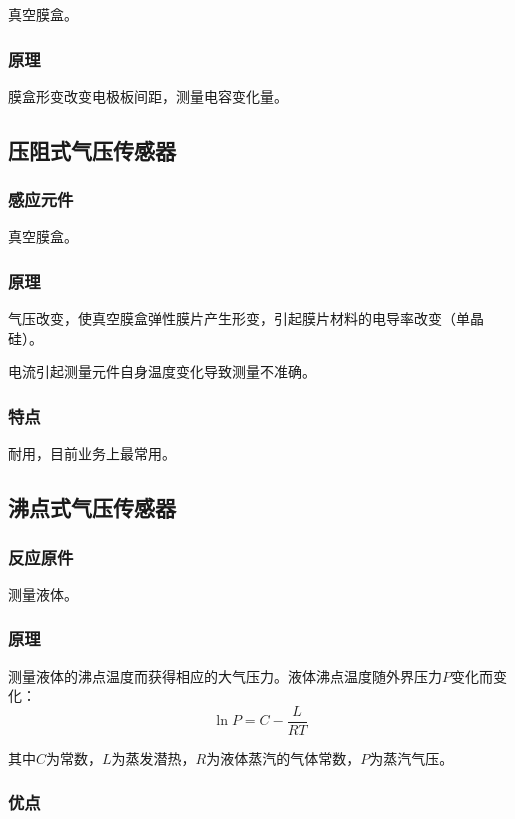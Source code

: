 \documentclass[UTF8,11pt]{ctexbook}
\begin{document}
真空膜盒。

\subsubsection{原理}

膜盒形变改变电极板间距，测量电容变化量。

\subsection{压阻式气压传感器}

\subsubsection{感应元件}

真空膜盒。

\subsubsection{原理}

气压改变，使真空膜盒弹性膜片产生形变，引起膜片材料的电导率改变（单晶硅）。

电流引起测量元件自身温度变化导致测量不准确。

\subsubsection{特点}

耐用，目前业务上最常用。

\subsection{沸点式气压传感器}

\subsubsection{反应原件}

测量液体。

\subsubsection{原理}

测量液体的沸点温度而获得相应的大气压力。液体沸点温度随外界压力\(P\)变化而变化：
\[
\ln P=C-\frac{L}{RT}
\]

其中\(C\)为常数，\(L\)为蒸发潜热，\(R\)为液体蒸汽的气体常数，\(P\)为蒸汽气压。

\subsubsection{优点}
\end{document}
